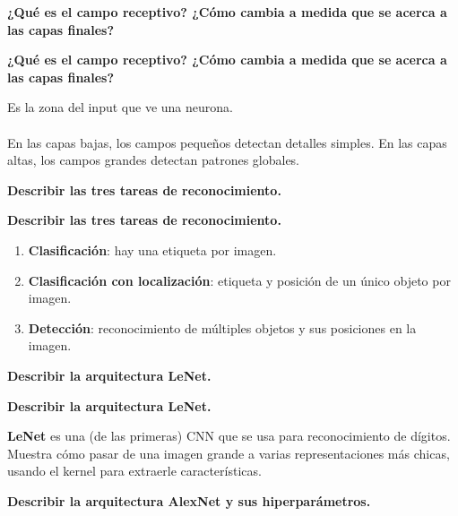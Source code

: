 \documentclass[10pt]{memoir}
\begin{document}
\clearpage
\begin{center}
	\textbf{\Large ¿Qué es el campo receptivo? ¿Cómo cambia a medida que se acerca a las capas finales?}
\end{center}

\clearpage
\begin{center}
	\textbf{\Large ¿Qué es el campo receptivo? ¿Cómo cambia a medida que se acerca a las capas finales?}
\end{center}
\noindent Es la zona del input que ve una neurona. \\
\\
\noindent En las capas bajas, los campos pequeños detectan detalles simples. En las capas altas, los campos grandes detectan patrones globales.


\clearpage
\begin{center}
	\textbf{\Large Describir las tres tareas de reconocimiento.}
\end{center}

\clearpage
\begin{center}
	\textbf{\Large Describir las tres tareas de reconocimiento.}
\end{center}
\begin{enumerate}
	\item \textbf{Clasificación}: hay una etiqueta por imagen.
	\item \textbf{Clasificación con localización}: etiqueta y posición de un único objeto por imagen.
	\item \textbf{Detección}: reconocimiento de múltiples objetos y sus posiciones en la imagen.
\end{enumerate}

\clearpage
\begin{center}
	\textbf{\Large Describir la arquitectura LeNet.}
\end{center}

\clearpage
\begin{center}
	\textbf{\Large Describir la arquitectura LeNet.}
\end{center}
\noindent \textbf{LeNet} es una (de las primeras) CNN que se usa para reconocimiento de dígitos. Muestra cómo pasar de una imagen grande a varias representaciones más chicas, usando el kernel para extraerle características.

\clearpage
\begin{center}
	\textbf{\Large Describir la arquitectura AlexNet y sus hiperparámetros.}
\end{center}
\end{document}
